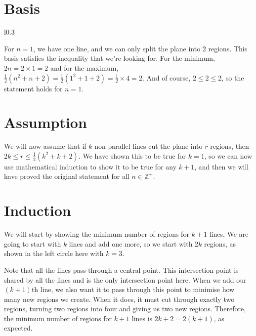 \documentclass[a4paper]{article}
\newcommand{\half}{\frac{1}{2}}
\newcommand{\hexpr}[1]{\half(#1^2 + #1 + 2)}
\begin{document}
\section{Basis}

\begin{wrapfigure}[5]{l}{0.3\linewidth}
\vspace{-1em}
\end{wrapfigure}

For $n = 1$, we have one line, and we can only split the plane into 2 regions. This basis satisfies the inequality that we're looking for. For the minimum, $2n = 2 \times 1 = 2$ and for the maximum, $\hexpr{n} = \hexpr{1} = \half \times 4 = 2$. And of course, $2 \leq 2 \leq 2$, so the statement holds for $n = 1$.

\vspace{4em}

\section{Assumption}

We will now assume that if $k$ non-parallel lines cut the plane into $r$ regions, then $2k \leq r \leq \hexpr{k}$. We have shown this to be true for $k = 1$, so we can now use mathematical induction to show it to be true for any $k + 1$, and then we will have proved the original statement for all $n \in \mathbb{Z}^+$.

\newpage

\section{Induction}

We will start by showing the minimum number of regions for $k + 1$ lines. We are going to start with $k$ lines and add one more, so we start with $2k$ regions, as shown in the left circle here with $k = 3$.

Note that all the lines pass through a central point. This intersection point is shared by all the lines and is the only intersection point here. When we add our $(k + 1)$th line, we also want it to pass through this point to minimise how many new regions we create. When it does, it must cut through exactly two regions, turning two regions into four and giving us two new regions. Therefore, the minimum number of regions for $k + 1$ lines is $2k + 2 = 2(k + 1)$, as expected.
\end{document}

